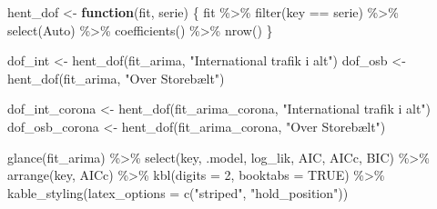 \documentclass[
  danish,
]{article}
\newenvironment{Shaded}{\begin{snugshade}}{\end{snugshade}}
\newcommand{\AttributeTok}[1]{\textcolor[rgb]{0.40,0.45,0.13}{#1}}
\newcommand{\ConstantTok}[1]{\textcolor[rgb]{0.56,0.35,0.01}{#1}}
\newcommand{\ControlFlowTok}[1]{\textcolor[rgb]{0.00,0.23,0.31}{\textbf{#1}}}
\newcommand{\DecValTok}[1]{\textcolor[rgb]{0.68,0.00,0.00}{#1}}
\newcommand{\FunctionTok}[1]{\textcolor[rgb]{0.28,0.35,0.67}{#1}}
\newcommand{\NormalTok}[1]{\textcolor[rgb]{0.00,0.23,0.31}{#1}}
\newcommand{\OtherTok}[1]{\textcolor[rgb]{0.00,0.23,0.31}{#1}}
\newcommand{\SpecialCharTok}[1]{\textcolor[rgb]{0.37,0.37,0.37}{#1}}
\newcommand{\StringTok}[1]{\textcolor[rgb]{0.13,0.47,0.30}{#1}}
\begin{document}
\begin{Shaded}
\begin{Highlighting}[]
\NormalTok{hent\_dof }\OtherTok{\textless{}{-}} \ControlFlowTok{function}\NormalTok{(fit, serie) \{}
\NormalTok{  fit }\SpecialCharTok{\%\textgreater{}\%}
    \FunctionTok{filter}\NormalTok{(key }\SpecialCharTok{==}\NormalTok{ serie) }\SpecialCharTok{\%\textgreater{}\%}
    \FunctionTok{select}\NormalTok{(Auto) }\SpecialCharTok{\%\textgreater{}\%}
    \FunctionTok{coefficients}\NormalTok{() }\SpecialCharTok{\%\textgreater{}\%}
    \FunctionTok{nrow}\NormalTok{()}
\NormalTok{\}}

\NormalTok{dof\_int }\OtherTok{\textless{}{-}} \FunctionTok{hent\_dof}\NormalTok{(fit\_arima, }\StringTok{"International trafik i alt"}\NormalTok{)}
\NormalTok{dof\_osb }\OtherTok{\textless{}{-}} \FunctionTok{hent\_dof}\NormalTok{(fit\_arima, }\StringTok{"Over Storebælt"}\NormalTok{)}

\NormalTok{dof\_int\_corona }\OtherTok{\textless{}{-}} \FunctionTok{hent\_dof}\NormalTok{(fit\_arima\_corona, }\StringTok{"International trafik i alt"}\NormalTok{)}
\NormalTok{dof\_osb\_corona }\OtherTok{\textless{}{-}} \FunctionTok{hent\_dof}\NormalTok{(fit\_arima\_corona, }\StringTok{"Over Storebælt"}\NormalTok{)}
\end{Highlighting}
\end{Shaded}

\begin{Shaded}
\begin{Highlighting}[]
\FunctionTok{glance}\NormalTok{(fit\_arima) }\SpecialCharTok{\%\textgreater{}\%}
  \FunctionTok{select}\NormalTok{(key, .model, log\_lik, AIC, AICc, BIC) }\SpecialCharTok{\%\textgreater{}\%}
  \FunctionTok{arrange}\NormalTok{(key, AICc) }\SpecialCharTok{\%\textgreater{}\%}
  \FunctionTok{kbl}\NormalTok{(}\AttributeTok{digits =} \DecValTok{2}\NormalTok{, }\AttributeTok{booktabs =} \ConstantTok{TRUE}\NormalTok{) }\SpecialCharTok{\%\textgreater{}\%}
  \FunctionTok{kable\_styling}\NormalTok{(}\AttributeTok{latex\_options =} \FunctionTok{c}\NormalTok{(}\StringTok{"striped"}\NormalTok{, }\StringTok{"hold\_position"}\NormalTok{))}
\end{Highlighting}
\end{Shaded}
\end{document}
